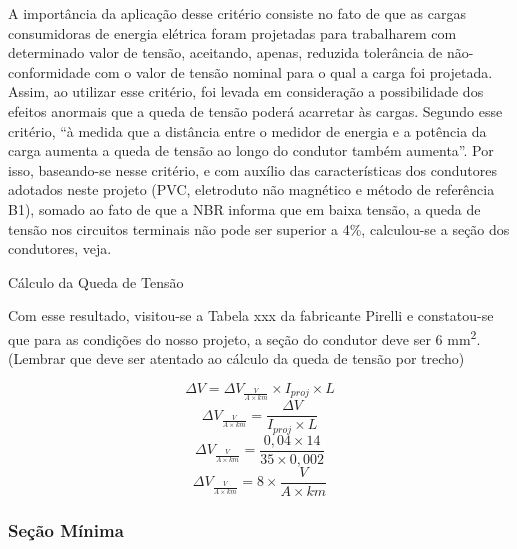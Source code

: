 A importância da aplicação desse critério consiste no fato de que as cargas consumidoras de energia elétrica foram projetadas para trabalharem com determinado valor de tensão, aceitando, apenas, reduzida tolerância de não-conformidade com o valor de tensão nominal para o qual a carga foi projetada.
Assim, ao utilizar esse critério, foi levada em consideração a possibilidade dos efeitos anormais que a queda de tensão poderá acarretar às cargas.
 Segundo esse critério, “à medida que a distância entre o medidor de energia e a potência da carga aumenta a queda de tensão ao longo do condutor também aumenta”. 
Por isso, baseando-se nesse critério, e com auxílio das características dos condutores adotados neste projeto (PVC, eletroduto não magnético e método de referência B1), somado ao fato de que a NBR informa que em baixa tensão, a queda de tensão nos circuitos terminais não pode ser superior a 4\%, calculou-se a seção dos condutores, veja.

\begin{description}

	\item Cálculo da Queda de Tensão
	
	Com esse resultado, visitou-se a Tabela xxx da fabricante Pirelli e constatou-se que para as condições do nosso projeto, a seção do condutor deve ser 6 mm\textsuperscript{2}.
(Lembrar que deve ser atentado ao cálculo da queda de tensão por trecho)

\begin{equation}
	\Delta V = \Delta V_{\frac{V}{A \times km}} \times I_{proj} \times L
\end{equation}
\begin{equation}
	\Delta V_{\frac{V}{A \times km}} = \frac{\Delta V} {I_{proj} \times L}
\end{equation}
\begin{equation}
	\Delta V_{\frac{V}{A \times km}} = \frac{0,04 \times 14}{35 \times 0,002}
\end{equation}
\begin{equation}
	\Delta V_{\frac{V}{A \times km}} = 8 \times \frac{V}{A \times km}
\end{equation}

\end{description}

\subsubsection{Seção Mínima}

